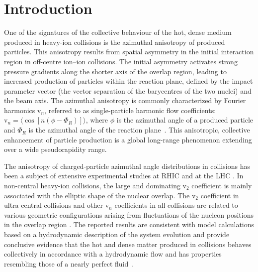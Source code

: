 \documentclass[cernpreprint,texlive=2014,txfonts,UKenglish]{latex/atlasdoc}
\begin{document}
\maketitle

\section{Introduction}
\label{sec:intro}
One of the signatures of the collective behaviour of the hot, dense medium produced in heavy-ion collisions is the azimuthal anisotropy of produced particles. This anisotropy results from spatial asymmetry in the initial interaction region in off-centre ion--ion collisions. The initial asymmetry activates strong pressure gradients along the shorter axis of the overlap region, leading to increased production of particles within the reaction plane, defined by the impact parameter vector (the vector separation of the barycentres of the two nuclei) and the beam axis.  The azimuthal anisotropy is commonly characterized by Fourier harmonics $\mathrm{v}_n$, referred to as single-particle harmonic flow coefficients: $\mathrm{v}_n= \langle \cos [n(\phi-\Phi_R)] \rangle$, where $\phi$ is the azimuthal angle of a produced particle and $\Phi_R$ is the azimuthal angle of the reaction plane~\cite{Poskanzer:1998yz}.  This anisotropic, collective  enhancement of particle production is a global long-range phenomenon extending over a wide pseudorapidity range. 

The anisotropy of charged-particle azimuthal angle distributions in \NucNuc collisions has been a subject of extensive experimental studies at RHIC  \cite{flowReview,flowReview1,brahms1,phobos1,star1,phenix1} and at the LHC  \cite{Alice1,Alice2,Atlas1,Alice4,Atlas2,Cms1,Cms2,Atlas3,Cms4,Cms5,
Alice9,Atlas5,Atlas6,Alice10,Alice11}.  In non-central heavy-ion collisions, the large and dominating $\mathrm{v}_2$ coefficient is mainly associated with the elliptic shape of the nuclear overlap. The $\mathrm{v}_2$ coefficient in ultra-central collisions and other $\mathrm{v}_n$ coefficients in all collisions are related to various geometric configurations arising from fluctuations of the nucleon positions in the overlap region \cite{roland,fluctCGC}.  The reported results are consistent with model calculations based on a hydrodynamic description of the system evolution and  provide conclusive evidence that the hot and dense matter produced in \NucNuc collisions behaves collectively in accordance with a hydrodynamic flow and has properties resembling those of a nearly perfect fluid~\cite{hydro1,hydro2,hydro3,Kovtun:2004de}. 
\end{document}
